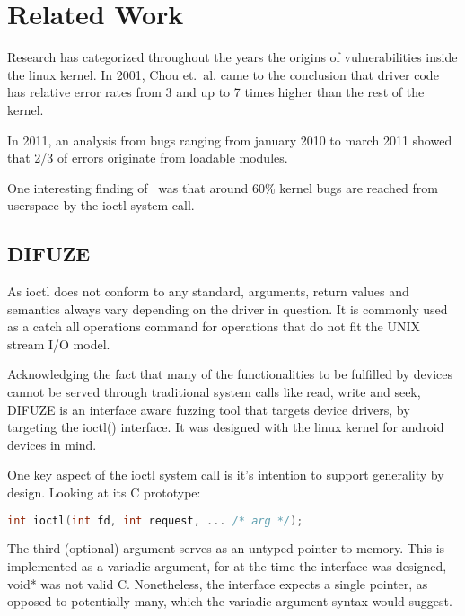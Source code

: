 \section{Related Work}\label{s:related-work}


Research has categorized throughout the years the origins of
vulnerabilities inside the linux kernel. In 2001,  Chou et.~al.
came to the conclusion that driver code has relative error rates
from 3 and up to 7 times higher than the rest of the kernel\cite{chouEmpiricalStudyOperating2001}.

In 2011, an analysis from bugs ranging from january 2010 to march 2011
showed that 2/3 of errors originate from loadable modules\cite{chenLinuxKernelVulnerabilities2011}.

One interesting finding of~\cite{vanderstoepAndroidProtectingKernel2016} was that around 60\% kernel bugs
are reached from userspace by the ioctl system call.

\subsection{DIFUZE}\label{ss:difuze}

As ioctl does not conform to any standard, arguments, return values and semantics always vary
depending on the driver in question. It is commonly used as a catch all operations command for
operations that do not fit the UNIX stream I/O model.

Acknowledging the fact that many of the functionalities to be fulfilled
by devices cannot be served through traditional system calls like read, write
and seek, DIFUZE is an interface aware fuzzing tool that targets
device drivers, by targeting the ioctl() interface\cite{corinaDIFUZEInterfaceAware2017}.
It was designed with the linux kernel for android devices in mind.


One key aspect of the ioctl system call is it's intention to support generality by design.
Looking at its C prototype:

\begin{lstlisting}[language=c]
  int ioctl(int fd, int request, ... /* arg */);
\end{lstlisting}

The third (optional) argument serves as an untyped pointer to memory. This is implemented as a variadic argument, for at the time
the interface was designed, void* was not valid C. Nonetheless, the interface expects a single pointer, as opposed to potentially
many, which the variadic argument syntax would suggest.

